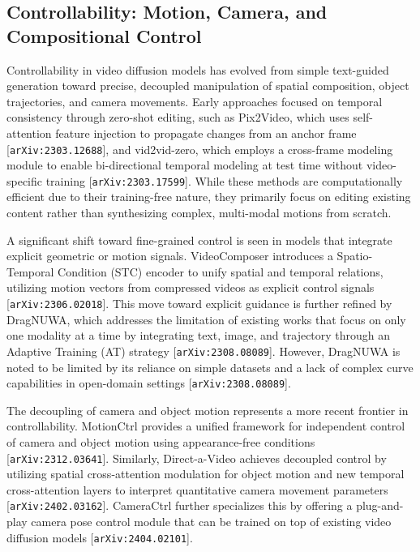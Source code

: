 \documentclass[11pt]{article}
\begin{document}
\subsection{Controllability: Motion, Camera, and Compositional Control}

Controllability in video diffusion models has evolved from simple text-guided generation toward precise, decoupled manipulation of spatial composition, object trajectories, and camera movements. Early approaches focused on temporal consistency through zero-shot editing, such as Pix2Video, which uses self-attention feature injection to propagate changes from an anchor frame [\texttt{arXiv:2303.12688}], and vid2vid-zero, which employs a cross-frame modeling module to enable bi-directional temporal modeling at test time without video-specific training [\texttt{arXiv:2303.17599}]. While these methods are computationally efficient due to their training-free nature, they primarily focus on editing existing content rather than synthesizing complex, multi-modal motions from scratch.

A significant shift toward fine-grained control is seen in models that integrate explicit geometric or motion signals. VideoComposer introduces a Spatio-Temporal Condition (STC) encoder to unify spatial and temporal relations, utilizing motion vectors from compressed videos as explicit control signals [\texttt{arXiv:2306.02018}]. This move toward explicit guidance is further refined by DragNUWA, which addresses the limitation of existing works that focus on only one modality at a time by integrating text, image, and trajectory through an Adaptive Training (AT) strategy [\texttt{arXiv:2308.08089}]. However, DragNUWA is noted to be limited by its reliance on simple datasets and a lack of complex curve capabilities in open-domain settings [\texttt{arXiv:2308.08089}].

The decoupling of camera and object motion represents a more recent frontier in controllability. MotionCtrl provides a unified framework for independent control of camera and object motion using appearance-free conditions [\texttt{arXiv:2312.03641}]. Similarly, Direct-a-Video achieves decoupled control by utilizing spatial cross-attention modulation for object motion and new temporal cross-attention layers to interpret quantitative camera movement parameters [\texttt{arXiv:2402.03162}]. CameraCtrl further specializes this by offering a plug-and-play camera pose control module that can be trained on top of existing video diffusion models [\texttt{arXiv:2404.02101}].
\end{document}
